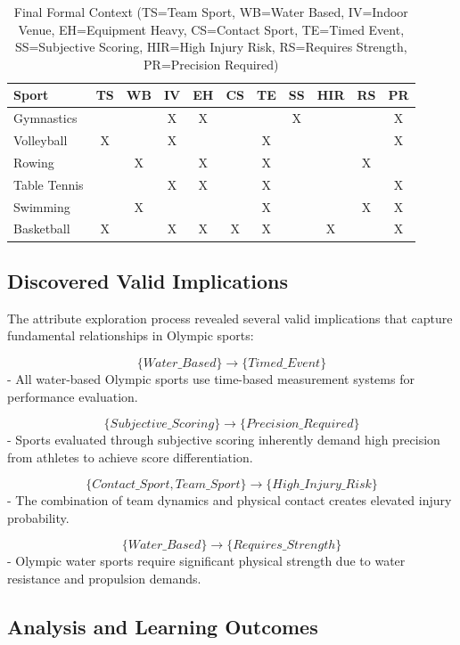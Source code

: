 \documentclass{article}
\begin{document}
\begin{table}[h]
\centering
\begin{tabular}{|l|c|c|c|c|c|c|c|c|c|c|}
\hline
Sport & TS & WB & IV & EH & CS & TE & SS & HIR & RS & PR \\
\hline
Gymnastics & & & X & X & & & X & & & X \\
Volleyball & X & & X & & & X & & & & X \\
Rowing & & X & & X & & X & & & X & \\
Table Tennis & & & X & X & & X & & & & X \\
Swimming & & X & & & & X & & & X & X \\
Basketball & X & & X & X & X & X & & X & & X \\
\hline
\end{tabular}
\caption{Final Formal Context (TS=Team Sport, WB=Water Based, IV=Indoor Venue, EH=Equipment Heavy, CS=Contact Sport, TE=Timed Event, SS=Subjective Scoring, HIR=High Injury Risk, RS=Requires Strength, PR=Precision Required)}
\end{table}

\subsection*{Discovered Valid Implications}

The attribute exploration process revealed several valid implications that capture fundamental relationships in Olympic sports:

$$\{Water\_Based\} \rightarrow \{Timed\_Event\}$$ 
- All water-based Olympic sports use time-based measurement systems for performance evaluation.

$$\{Subjective\_Scoring\} \rightarrow \{Precision\_Required\}$$- Sports evaluated through subjective scoring inherently demand high precision from athletes to achieve score differentiation.

$$\{Contact\_Sport, Team\_Sport\} \rightarrow \{High\_Injury\_Risk\}$$- The combination of team dynamics and physical contact creates elevated injury probability.

$$\{Water\_Based\} \rightarrow \{Requires\_Strength\}$$- Olympic water sports require significant physical strength due to water resistance and propulsion demands.

\subsection*{Analysis and Learning Outcomes}
\end{document}

